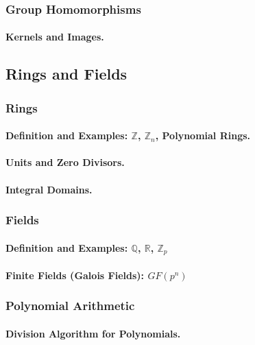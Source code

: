 \subsubsection{Group Homomorphisms}
\paragraph{Kernels and Images.}

\subsection{Rings and Fields}
\label{subsec:rings-fields}

\subsubsection{Rings}
\paragraph{Definition and Examples: $\mathbb{Z}$, $\mathbb{Z}_n$, Polynomial Rings.}
\paragraph{Units and Zero Divisors.}
\paragraph{Integral Domains.}

\subsubsection{Fields}
\paragraph{Definition and Examples: $\mathbb{Q}$, $\mathbb{R}$, $\mathbb{Z}_p$}
\paragraph{Finite Fields (Galois Fields): $GF(p^n)$}

\subsubsection{Polynomial Arithmetic}
\paragraph{Division Algorithm for Polynomials.}
